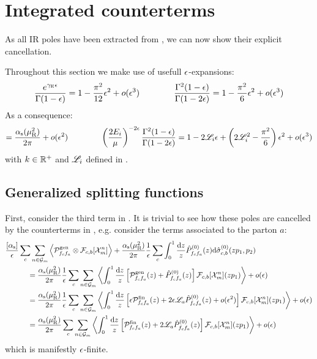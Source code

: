 \section{Integrated counterterms}

As all IR poles have been extracted from , we can now show their explicit cancellation.

Throughout this section we make use of usefull $ \epsilon $-expansions:
\begin{equation}
  \frac{e^{\gamma_\text{E}\epsilon}}{\Gamma(1-\epsilon)} = 1 - \frac{\pi^2}{12} \epsilon^2 + o(\epsilon^3)
  \qquad \qquad
  \frac{\Gamma^2(1-\epsilon)}{\Gamma(1-2\epsilon)} = 1 - \frac{\pi^2}{6} \epsilon^2 + o(\epsilon^3)
\end{equation}
As a consequence:
\begin{equation}
  [\rc] = \frac{\rcr}{2\pi} + \smo(\de^2)
  \qquad \qquad
  \left( \frac{2E_i}{\mu} \right)^{-2\de} \frac{\Gamma^2(1-\de)}{\Gamma(1-2\de)} = 1 - 2\ler_i \de + \left( 2\ler_i^2 - \frac{\pi^2}{6} \right) \de^2 + \smo(\de^3)
\end{equation}
with $ k \in \mathbb{R}^+ $ and $ \mathscr{L}_i $ defined in .

\subsection{Generalized splitting functions}

First, consider the third term in . It is trivial to see how these poles are cancelled by the counterterms in , e.g. consider the terms associated to the parton $ a $:
\begin{equation*}
  \begin{split}
    & \frac{[\alpha_\text{s}]}{\epsilon} \sum_c \sum_{n \in \mathcal{G}_m} \left\langle \mathcal{P}^\text{gen}_{f_c f_a} \otimes \mathcal{F}_{c,b}[\mathcal{X}^{n}_{m}] \right\rangle + \frac{\alpha_\text{s}(\mu_\text{R}^2)}{2\pi} \frac{1}{\epsilon} \sum_c \int_0^1 \frac{\mathrm{d} z}{z} \hat{P}^{(0)}_{f_c f_a}(z) \mathrm{d}\hat{\sigma}^{(0)}_{c,b}(zp_1 , p_2) \\
    & \qquad \quad = \frac{\alpha_\text{s}(\mu_\text{R}^2)}{2\pi} \frac{1}{\epsilon} \sum_c \sum_{n \in \mathcal{G}_m} \left\langle \int_0^1 \frac{\mathrm{d} z}{z} \left[ \mathcal{P}^\text{gen}_{f_c f_a}(z) + \hat{P}^{(0)}_{f_c f_a}(z) \right] \mathcal{F}_{c,b}[\mathcal{X}^{n}_{m}](zp_1) \right\rangle + o(\epsilon) \\
    & \qquad \quad = \frac{\alpha_\text{s}(\mu_\text{R}^2)}{2\pi} \frac{1}{\epsilon} \sum_c \sum_{n \in \mathcal{G}_m} \left\langle \int_0^1 \frac{\mathrm{d} z}{z} \left[ \epsilon \mathcal{P}^\text{fin}_{f_c f_a}(z) + 2 \epsilon \mathscr{L}_a \hat{P}^{(0)}_{f_c f_a}(z) + o(\epsilon^2) \right] \mathcal{F}_{c,b}[\mathcal{X}^{n}_{m}](zp_1) \right\rangle + o(\epsilon) \\
    & \qquad \quad = \frac{\alpha_\text{s}(\mu_\text{R}^2)}{2\pi} \sum_c \sum_{n \in \mathcal{G}_m} \left\langle \int_0^1 \frac{\mathrm{d} z}{z} \left[ \mathcal{P}^\text{fin}_{f_c f_a}(z) + 2 \mathscr{L}_a \hat{P}^{(0)}_{f_c f_a}(z) \right] \mathcal{F}_{c,b}[\mathcal{X}^{n}_{m}](zp_1) \right\rangle + o(\epsilon) \\
  \end{split}
\end{equation*}
which is manifestly $ \epsilon $-finite.

